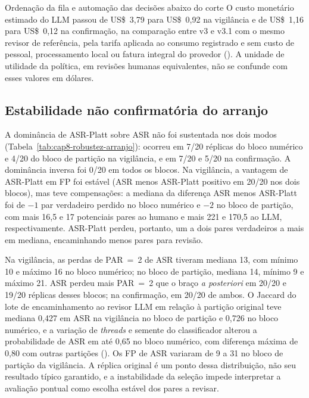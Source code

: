 \begin{chapter}{Ordenação da fila e automação das decisões abaixo do corte}
O custo monetário estimado do LLM passou de US\$~3,79 para US\$~0,92 na vigilância e de US\$~1,16 para US\$~0,12 na confirmação, na comparação entre v3 e v3.1 com o mesmo revisor de referência, pela tarifa aplicada ao consumo registrado e sem custo de pessoal, processamento local ou fatura integral do provedor (). A unidade de utilidade da política, em revisões humanas equivalentes, não se confunde com esses valores em dólares.

\subsection{Estabilidade não confirmatória do arranjo}\label{sec:e4-robustez}

A dominância de ASR-Platt sobre ASR não foi sustentada nos dois modos (Tabela~\ref{tab:cap8-robustez-arranjo}): ocorreu em 7/20 réplicas do bloco numérico e 4/20 do bloco de partição na vigilância, e em 7/20 e 5/20 na confirmação. A dominância inversa foi 0/20 em todos os blocos. Na vigilância, a vantagem de ASR-Platt em FP foi estável (ASR menos ASR-Platt positivo em 20/20 nos dois blocos), mas teve compensações: a mediana da diferença ASR menos ASR-Platt foi de $-1$ par verdadeiro perdido no bloco numérico e $-2$ no bloco de partição, com mais 16,5 e 17 potenciais pares ao humano e mais 221 e 170,5 ao LLM, respectivamente. ASR-Platt perdeu, portanto, um a dois pares verdadeiros a mais em mediana, encaminhando menos pares para revisão.

\begin{table}[!ht]
\centering
\caption{Estabilidade da dominância de ASR-Platt (análise de sensibilidade de ASR com \textit{Platt scaling} abaixo do corte) sobre ASR (arranjo sequencial com calibração isotônica abaixo do corte) entre réplicas, isto é, reexecuções com outra semente, número de processos paralelos ou partição.}
\label{tab:cap8-robustez-arranjo}
\begin{minipage}{\linewidth}
\centering

\end{minipage}
\end{table}

Na vigilância, as perdas de PAR~=~2 de ASR tiveram mediana 13, com mínimo 10 e máximo 16 no bloco numérico; no bloco de partição, mediana 14, mínimo 9 e máximo 21. ASR perdeu mais PAR~=~2 que o braço \textit{a posteriori} em 20/20 e 19/20 réplicas desses blocos; na confirmação, em 20/20 de ambos. O Jaccard do lote de encaminhamento ao revisor LLM em relação à partição original teve mediana 0,427 em ASR na vigilância no bloco de partição e 0,726 no bloco numérico, e a variação de \textit{threads} e semente do classificador alterou a probabilidade de ASR em até 0,65 no bloco numérico, com diferença máxima de 0,80 com outras partições (). Os FP de ASR variaram de 9 a 31 no bloco de partição da vigilância. A réplica original é um ponto dessa distribuição, não seu resultado típico garantido, e a instabilidade da seleção impede interpretar a avaliação pontual como escolha estável dos pares a revisar.


\end{chapter}
